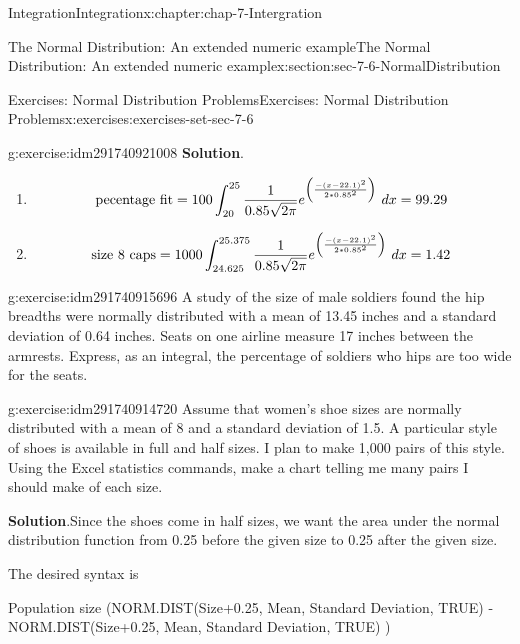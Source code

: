 \documentclass[oneside,10pt,]{book}
\numberwithin{equation}{section}
\begin{document}
\begin{chapterptx}{Integration}{}{Integration}{}{}{x:chapter:chap-7-Intergration}
\begin{sectionptx}{The Normal Distribution: An extended numeric example}{}{The Normal Distribution: An extended numeric example}{}{}{x:section:sec-7-6-NormalDistribution}
\begin{exercises-subsection}{Exercises: Normal Distribution Problems}{}{Exercises: Normal Distribution Problems}{}{}{x:exercises:exercises-set-sec-7-6}
\begin{divisionexercise}{5}{}{}{g:exercise:idm291740921008}
\noindent\textbf{Solution}.\hypertarget{g:solution:idm291740918096}{}\quad{}%
\begin{enumerate}[label=(\alph*)]
\item{}%
\begin{equation*}
\hbox{pecentage fit}=100\int_{20}^{25}\frac{1}{0.85\sqrt{2\pi}} e^{\left({\frac{-(x-22.1)^2}{2*0.85^2}}\right)}\ dx =99.29
\end{equation*}
%
\item{}%
\begin{equation*}
\hbox{size 8 caps}=1000\int_{24.625}^{25.375}\frac{1}{0.85\sqrt{2\pi}} e^{\left({\frac{-(x-22.1)^2}{2*0.85^2}}\right)}\ dx =1.42
\end{equation*}
%
\end{enumerate}
\end{divisionexercise}%
\begin{divisionexercise}{6}{}{}{g:exercise:idm291740915696}%
A study of the size of male soldiers found the hip breadths were normally distributed with a mean of 13.45 inches and a standard deviation of 0.64 inches.  Seats on one airline measure 17 inches between the armrests.  Express, as an integral, the percentage of soldiers who hips are too wide for the seats.%
\end{divisionexercise}%
\begin{divisionexercise}{7}{}{}{g:exercise:idm291740914720}%
Assume that women’s shoe sizes are normally distributed with a mean of 8 and a standard deviation of 1.5.  A particular style of shoes is available in full and half sizes.  I plan to make 1,000 pairs of this style.  Using the Excel statistics commands, make a chart telling me many pairs I should make of each size.%
\par\smallskip%
\noindent\textbf{Solution}.\hypertarget{g:solution:idm291740913872}{}\quad{}Since the shoes come in half sizes, we want the area under the normal distribution function from 0.25 before the given size to 0.25 after the given size.%
\par
The desired syntax is%
\par
Population size \textasteriskcentered{} (NORM.DIST(Size+0.25, Mean, Standard Deviation, TRUE) - NORM.DIST(Size+0.25, Mean, Standard Deviation, TRUE) )%
\begin{sidebyside}{1}{0.1}{0.1}{0}%
\begin{sbspanel}{0.8}%

\end{sbspanel}
\end{sidebyside}
\end{divisionexercise}
\end{exercises-subsection}
\end{sectionptx}
\end{chapterptx}
\end{document}
